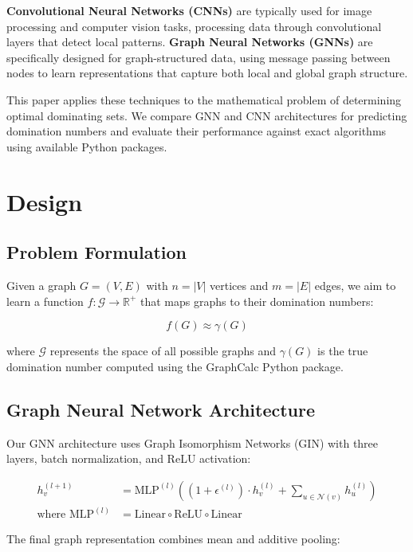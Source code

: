 \documentclass{article}
\begin{document}
\textbf{Convolutional Neural Networks (CNNs)} are typically used for image processing and computer vision tasks, processing data through convolutional layers that detect local patterns. \textbf{Graph Neural Networks (GNNs)} are specifically designed for graph-structured data, using message passing between nodes to learn representations that capture both local and global graph structure.

This paper applies these techniques to the mathematical problem of determining optimal dominating sets. We compare GNN and CNN architectures for predicting domination numbers and evaluate their performance against exact algorithms using available Python packages.

\section{Design}

\subsection{Problem Formulation}

Given a graph $G = (V, E)$ with $n = |V|$ vertices and $m = |E|$ edges, we aim to learn a function $f: \mathcal{G} \rightarrow \mathbb{R}^+$ that maps graphs to their domination numbers:

\begin{equation}
f(G) \approx \gamma(G)
\end{equation}

where $\mathcal{G}$ represents the space of all possible graphs and $\gamma(G)$ is the true domination number computed using the GraphCalc Python package.

\subsection{Graph Neural Network Architecture}

Our GNN architecture uses Graph Isomorphism Networks (GIN) with three layers, batch normalization, and ReLU activation:

\begin{align}
h_v^{(l+1)} &= \text{MLP}^{(l)}\left((1 + \epsilon^{(l)}) \cdot h_v^{(l)} + \sum_{u \in \mathcal{N}(v)} h_u^{(l)}\right) \\
\text{where } \text{MLP}^{(l)} &= \text{Linear} \circ \text{ReLU} \circ \text{Linear}
\end{align}

The final graph representation combines mean and additive pooling:
\end{document}
